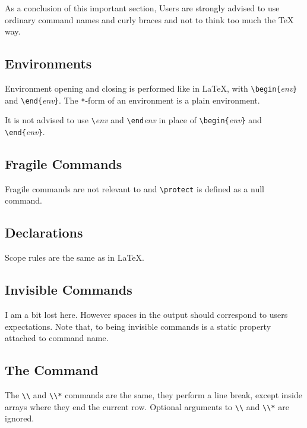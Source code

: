 As a conclusion of this important section,
Users are strongly advised to use ordinary command names and
curly braces and not to think too much the \TeX{} way.




\subsection{Environments}

Environment opening and closing is performed like in \LaTeX{}, with
\verb+\begin{+\textit{env}\verb+}+ and
\verb+\end{+\textit{env}\verb+}+.
The \verb+*+-form of an environment is a plain environment.

It is not advised to use \verb+\+\textit{env} and
\verb+\end+\textit{env} in place of \verb+\begin{+\textit{env}\verb+}+ and
\verb+\end{+\textit{env}\verb+}+.

\subsection{Fragile Commands}
Fragile commands are not relevant to \hevea{} and \verb+\protect+ is
defined as a null command.

\subsection{Declarations}
Scope rules are the same as in \LaTeX.

\subsection{Invisible Commands}
I am a bit lost here. However spaces in the output should correspond
to users expectations. Note that, to \hevea{} being
invisible commands is a static property attached to command name.

\subsection{The \texttt{} Command}

The \verb+\\+ and \verb+\\*+ commands are the same, they perform a
line break, except inside arrays where they end the current row.
Optional arguments to \verb+\\+ and \verb+\\*+ are ignored.


